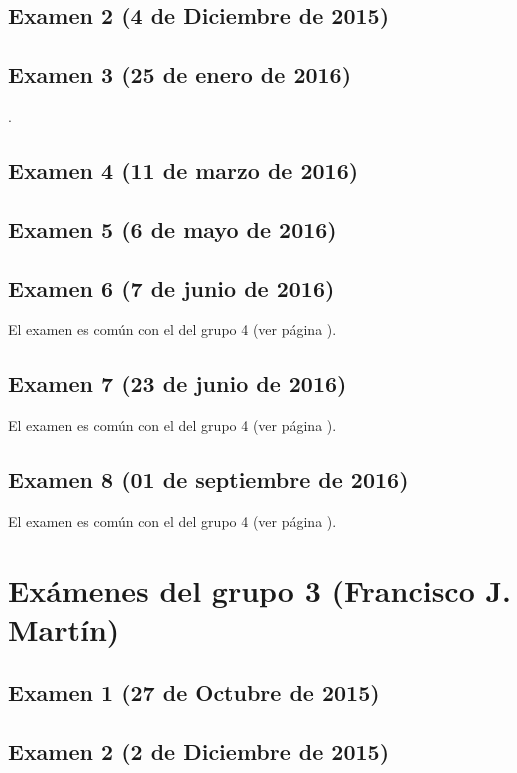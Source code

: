 \documentclass[a4paper,12pt,twoside]{book}
\begin{document}
\subsection{Examen 2 (4 de Diciembre de 2015)}
\subsection{Examen 3 (25 de enero de 2016)}
 \label{examen_15_16_2_3}.
\subsection{Examen 4 (11 de marzo de 2016)}
\subsection{Examen 5 (6 de mayo de 2016)}
\subsection{Examen 6 (7 de junio de 2016)} 
El examen es común con el del grupo 4 (ver página \pageref{examen_15_16_4_6}).
\subsection{Examen 7 (23 de junio de 2016)}
El examen es común con el del grupo 4 (ver página \pageref{examen_15_16_4_7}).
\subsection{Examen 8 (01 de septiembre de 2016)}
El examen es común con el del grupo 4 (ver página \pageref{examen_15_16_4_8}).

\section{Exámenes del grupo 3 (Francisco J. Martín)}
\subsection{Examen 1 (27 de Octubre de 2015)}
\subsection{Examen 2 (2 de Diciembre de 2015)}
\end{document}
